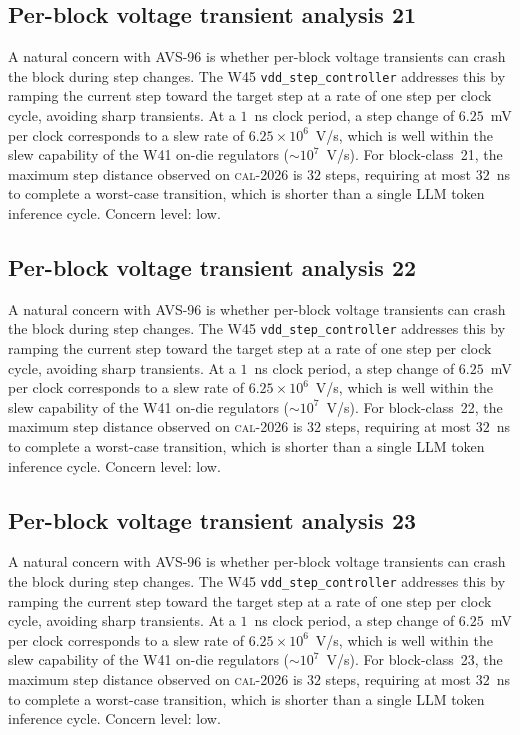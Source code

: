 \subsection{Per-block voltage transient analysis 21}

A natural concern with AVS-96 is whether per-block voltage transients
can crash the block during step changes. The W45 \texttt{vdd\_step\_controller} addresses this by ramping the current
step toward the target step at a rate of one step per clock cycle,
avoiding sharp transients. At a $1$~ns clock period, a step change of
$6.25$~mV per clock corresponds to a slew rate of $6.25\times 10^6$~V/s,
which is well within the slew capability of the W41 on-die regulators
($\sim 10^7$~V/s). For block-class~21, the maximum step distance
observed on \textsc{cal-2026} is $32$ steps, requiring at most $32$~ns
to complete a worst-case transition, which is shorter than a single
LLM token inference cycle. Concern level: low.


\subsection{Per-block voltage transient analysis 22}

A natural concern with AVS-96 is whether per-block voltage transients
can crash the block during step changes. The W45 \texttt{vdd\_step\_controller} addresses this by ramping the current
step toward the target step at a rate of one step per clock cycle,
avoiding sharp transients. At a $1$~ns clock period, a step change of
$6.25$~mV per clock corresponds to a slew rate of $6.25\times 10^6$~V/s,
which is well within the slew capability of the W41 on-die regulators
($\sim 10^7$~V/s). For block-class~22, the maximum step distance
observed on \textsc{cal-2026} is $32$ steps, requiring at most $32$~ns
to complete a worst-case transition, which is shorter than a single
LLM token inference cycle. Concern level: low.


\subsection{Per-block voltage transient analysis 23}

A natural concern with AVS-96 is whether per-block voltage transients
can crash the block during step changes. The W45 \texttt{vdd\_step\_controller} addresses this by ramping the current
step toward the target step at a rate of one step per clock cycle,
avoiding sharp transients. At a $1$~ns clock period, a step change of
$6.25$~mV per clock corresponds to a slew rate of $6.25\times 10^6$~V/s,
which is well within the slew capability of the W41 on-die regulators
($\sim 10^7$~V/s). For block-class~23, the maximum step distance
observed on \textsc{cal-2026} is $32$ steps, requiring at most $32$~ns
to complete a worst-case transition, which is shorter than a single
LLM token inference cycle. Concern level: low.



